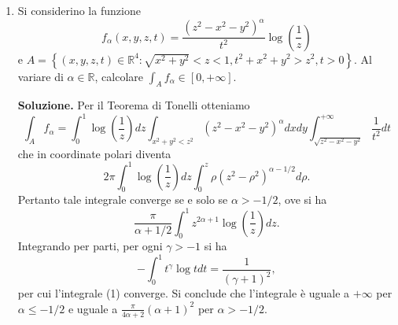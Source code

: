 \begin{enumerate}
		Abbiamo la trasformazione $(x,y) = T(u,v) = (u - v, v)$ e
		\[
		\tilde{D} = \left\{(u,v) \in \mathbb{R}^2 : -1 \leq u \leq 2v, v \leq 1\right\}.
		\]
		Dal teorema di cambiamento di variabile segue che
		\[
		\begin{aligned}
			\int_D f &= \int_{\tilde{D}} \frac{uv}{2 + u} du dv \\
			&= \int_{-1/2}^1 v \left(\int_{-1}^{2v} \frac{u}{2 + u} du\right) dv \\
			&= \int_{-1/2}^1 v \left(2v + 1 - 2 \log(2 + 2v)\right) dv \\
			&= \frac{3}{4} + \frac{3}{8} - 2 \int_{-1/2}^1 v \log(2 + 2v) dv = 0.
		\end{aligned}
		\]
		Infatti abbiamo
		\[
		\begin{aligned}
			\int_{-1/2}^1 v \log(2 + 2v) dv &= \left[\frac{v^2}{2} \log(2 + 2v)\right]_{v = -1/2}^{v = 1} - \frac{1}{2} \int_{-1/2}^1 \frac{v^2}{1 + v} dv \\
			&= \frac{\log 4}{2} - \frac{1}{2} \int_{-1/2}^1 \frac{v^2 - 1}{1 + v} dv - \frac{1}{2} \int_{-1/2}^1 \frac{1}{1 + v} dv \\
			&= \log 2 - \frac{1}{2} \int_{-1/2}^1 (v - 1) dv - \frac{1}{2} \log 4 \\
			&= \frac{1}{2} \int_{-1/2}^1 (1 - v) dv = \frac{1}{2} \left[v - \frac{v^2}{2}\right]_{v = -1/2}^{v = 1} = \frac{9}{16}.
		\end{aligned}
		\]
	
	
	\item Si considerino la funzione
	\[
	f_{\alpha}(x,y,z,t) = \frac{(z^2 - x^2 - y^2)^{\alpha}}{t^2} \log\left(\frac{1}{z}\right)
	\]
	e $A = \left\{(x,y,z,t) \in \mathbb{R}^4 : \sqrt{x^2 + y^2} < z < 1, t^2 + x^2 + y^2 > z^2, t > 0\right\}$.
	Al variare di $\alpha \in \mathbb{R}$, calcolare $\int_A f_{\alpha} \in [0, +\infty]$.
	
	\textbf{Soluzione.}
		Per il Teorema di Tonelli otteniamo
		\[
		\int_A f_{\alpha} = \int_0^1 \log\left(\frac{1}{z}\right) dz \int_{x^2 + y^2 < z^2} (z^2 - x^2 - y^2)^{\alpha} dx dy \int_{\sqrt{z^2 - x^2 - y^2}}^{+\infty} \frac{1}{t^2} dt
		\]
		che in coordinate polari diventa
		\[
		2\pi \int_0^1 \log\left(\frac{1}{z}\right) dz \int_0^z \rho (z^2 - \rho^2)^{\alpha - 1/2} d\rho.
		\]
		Pertanto tale integrale converge se e solo se $\alpha > -1/2$, ove si ha
		\[
		\frac{\pi}{\alpha + 1/2} \int_0^1 z^{2\alpha + 1} \log\left(\frac{1}{z}\right) dz. \tag{1}
		\]
		Integrando per parti, per ogni $\gamma > -1$ si ha
		\[
		-\int_0^1 t^{\gamma} \log t dt = \frac{1}{(\gamma + 1)^2},
		\]
		per cui l'integrale (1) converge. Si conclude che l'integrale è uguale a $+\infty$ per $\alpha \leq -1/2$ e uguale a $\frac{\pi}{4\alpha + 2}(\alpha + 1)^2$ per $\alpha > -1/2$.
	

\end{enumerate}
